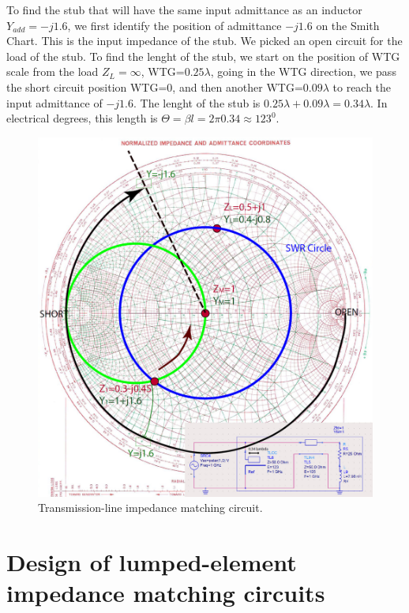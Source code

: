 \documentclass{ximera}
\begin{document}
To find the stub that will have the same input admittance as an inductor $Y_{add}=-j1.6$, we first identify the position of admittance $-j1.6$ on the Smith Chart. This is the input impedance of the stub. We picked an open circuit for the load of the stub. To find the lenght of the stub, we start on the position of WTG scale from the load $Z_L=\infty$, WTG=$0.25 \lambda$, going in the WTG direction, we pass the short circuit position WTG=$0$, and then another WTG=$0.09 \lambda$ to reach the input admittance of $-j1.6$. The lenght of the stub is $0.25 \lambda+0.09 \lambda=0.34 \lambda$. In electrical degrees, this length is $\Theta=\beta l =2 \pi 0.34 \approx 123^0$.




\begin{figure}[htbp]
\begin{center}
\includegraphics[scale=0.4]{../jpg/MatchTL.jpg}
\end{center}
\caption{Transmission-line impedance matching circuit.}
\label{fig:TransLineImpM}
\end{figure}


\section{Design of lumped-element impedance matching circuits}
\end{document}
